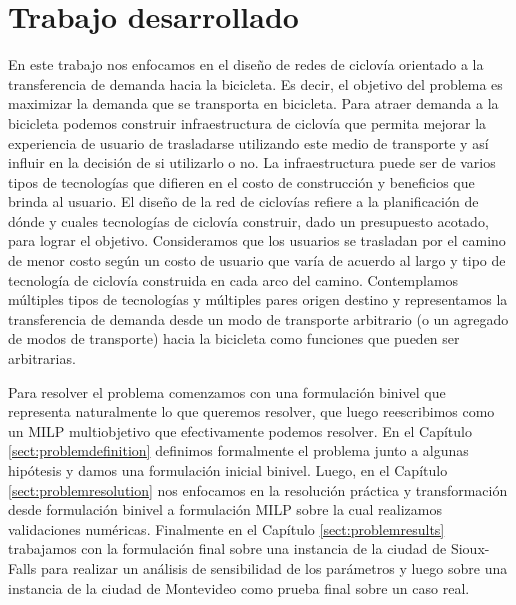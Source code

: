   \section{Trabajo desarrollado}

  En este trabajo nos enfocamos en el diseño de redes de ciclovía orientado a la transferencia de demanda hacia la bicicleta. Es decir, el objetivo del problema es maximizar la demanda que se transporta en bicicleta. Para atraer demanda a la bicicleta podemos construir infraestructura de ciclovía que permita mejorar la experiencia de usuario de trasladarse utilizando este medio de transporte y así influir en la decisión de si utilizarlo o no. La infraestructura puede ser de varios tipos de tecnologías que difieren en el costo de construcción y beneficios que brinda al usuario. El diseño de la red de ciclovías refiere a la planificación de dónde y cuales tecnologías de ciclovía construir, dado un presupuesto acotado, para lograr el objetivo. Consideramos que los usuarios se trasladan por el camino de menor costo según un costo de usuario que varía de acuerdo al largo y tipo de tecnología de ciclovía construida en cada arco del camino. Contemplamos múltiples tipos de tecnologías y múltiples pares origen destino y representamos la transferencia de demanda desde un modo de transporte arbitrario (o un agregado de modos de transporte) hacia la bicicleta como funciones que pueden ser arbitrarias.

  Para resolver el problema comenzamos con una formulación binivel que representa naturalmente lo que queremos resolver, que luego reescribimos como un MILP multiobjetivo que efectivamente podemos resolver. En el Capítulo \ref{sect:problemdefinition} definimos formalmente el problema junto a algunas hipótesis y damos una formulación inicial binivel. Luego, en el Capítulo \ref{sect:problemresolution} nos enfocamos en la resolución práctica y transformación desde formulación binivel a formulación MILP sobre la cual realizamos validaciones numéricas. Finalmente en el Capítulo \ref{sect:problemresults} trabajamos con la formulación final sobre una instancia de la ciudad de Sioux-Falls para realizar un análisis de sensibilidad de los parámetros y luego sobre una instancia de la ciudad de Montevideo como prueba final sobre un caso real.

